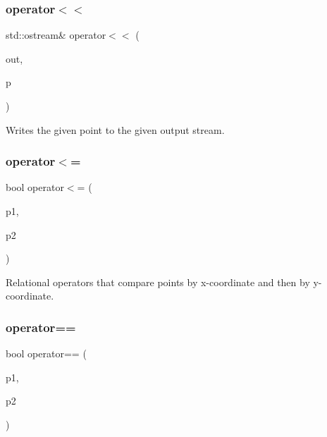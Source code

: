 \subsubsection{\texorpdfstring{operator$<$$<$}{operator<<}}
{\footnotesize\ttfamily std\+::ostream\& operator$<$$<$ (\begin{DoxyParamCaption}\item[{std\+::ostream \&}]{out,  }\item[{const \mbox{\hyperlink{structsgl_1_1GPoint}{G\+Point}} \&}]{p }\end{DoxyParamCaption})\hspace{0.3cm}{\ttfamily [friend]}}



Writes the given point to the given output stream. 

\mbox{\label{structsgl_1_1GPoint_a5b9606369659c394b2494828cb199b91}} 
\subsubsection{\texorpdfstring{operator$<$=}{operator<=}}
{\footnotesize\ttfamily bool operator$<$= (\begin{DoxyParamCaption}\item[{const \mbox{\hyperlink{structsgl_1_1GPoint}{G\+Point}} \&}]{p1,  }\item[{const \mbox{\hyperlink{structsgl_1_1GPoint}{G\+Point}} \&}]{p2 }\end{DoxyParamCaption})\hspace{0.3cm}{\ttfamily [friend]}}



Relational operators that compare points by x-\/coordinate and then by y-\/coordinate. 

\mbox{\label{structsgl_1_1GPoint_a128ff5199debc26d8f040bbd46f40a67}} 
\subsubsection{\texorpdfstring{operator==}{operator==}}
{\footnotesize\ttfamily bool operator== (\begin{DoxyParamCaption}\item[{const \mbox{\hyperlink{structsgl_1_1GPoint}{G\+Point}} \&}]{p1,  }\item[{const \mbox{\hyperlink{structsgl_1_1GPoint}{G\+Point}} \&}]{p2 }\end{DoxyParamCaption})\hspace{0.3cm}{\ttfamily [friend]}}



